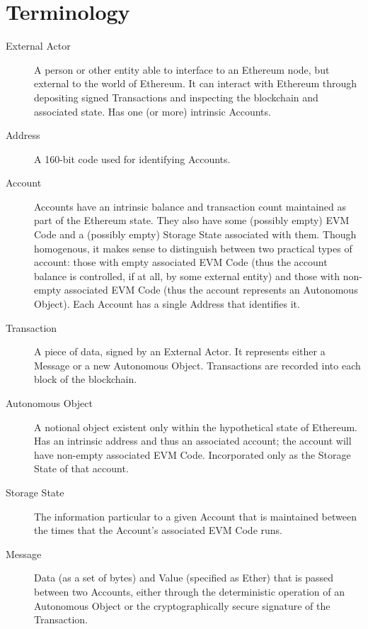 \documentclass[9pt,oneside]{amsart}
\begin{document}
\appendix

\section{Terminology}

\begin{description}
\item[External Actor] A person or other entity able to interface to an Ethereum node, but external to the world of Ethereum. It can interact with Ethereum through depositing signed Transactions and inspecting the blockchain and associated state. Has one (or more) intrinsic Accounts.

\item[Address] A 160-bit code used for identifying Accounts.

\item[Account] Accounts have an intrinsic balance and transaction count maintained as part of the Ethereum state. They also have some (possibly empty) EVM Code and a (possibly empty) Storage State associated with them. Though homogenous, it makes sense to distinguish between two practical types of account: those with empty associated EVM Code (thus the account balance is controlled, if at all, by some external entity) and those with non-empty associated EVM Code (thus the account represents an Autonomous Object). Each Account has a single Address that identifies it.

\item[Transaction] A piece of data, signed by an External Actor. It represents either a Message or a new Autonomous Object. Transactions are recorded into each block of the blockchain.

\item[Autonomous Object] A notional object existent only within the hypothetical state of Ethereum. Has an intrinsic address and thus an associated account; the account will have non-empty associated EVM Code. Incorporated only as the Storage State of that account.

\item[Storage State] The information particular to a given Account that is maintained between the times that the Account's associated EVM Code runs.

\item[Message] Data (as a set of bytes) and Value (specified as Ether) that is passed between two Accounts, either through the deterministic operation of an Autonomous Object or the cryptographically secure signature of the Transaction.


\end{description}
\end{document}
